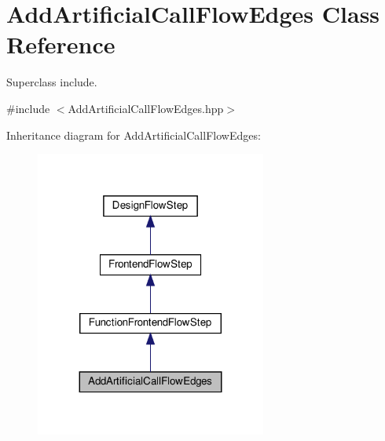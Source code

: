 \hypertarget{classAddArtificialCallFlowEdges}{}\section{Add\+Artificial\+Call\+Flow\+Edges Class Reference}
\label{classAddArtificialCallFlowEdges}


Superclass include.  




{\ttfamily \#include $<$Add\+Artificial\+Call\+Flow\+Edges.\+hpp$>$}



Inheritance diagram for Add\+Artificial\+Call\+Flow\+Edges\+:
\nopagebreak
\begin{figure}[H]
\begin{center}
\leavevmode
\includegraphics[width=215pt]{d7/ddd/classAddArtificialCallFlowEdges__inherit__graph}
\end{center}
\end{figure}


